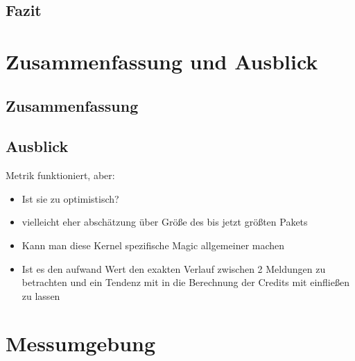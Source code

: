 \documentclass[a4paper, 12pt, BCOR10mm, DIV12, toc=bibliography, toc=listof, german]{scrbook}
\begin{document}

		\section{Fazit} %
		\label{sec:messungen-fazit}
		


	\chapter{Zusammenfassung und Ausblick} %
	\label{cha:zusammenfassung}

		\section{Zusammenfassung} %
		\label{sec:zusammenfassung}
			

		\section{Ausblick} %
		\label{sec:ausblick}

		Metrik funktioniert, aber:
		\begin{itemize}
			\item Ist sie zu optimistisch?
			\item vielleicht eher abschätzung über Größe des bis jetzt größten Pakets
			\item Kann man diese Kernel spezifische Magic allgemeiner machen
			\item Ist es den aufwand Wert den exakten Verlauf zwischen 2 Meldungen zu betrachten und ein
				Tendenz mit in die Berechnung der Credits mit einfließen zu lassen
		\end{itemize}
		
	


	\appendix

	\chapter{Messumgebung} %
	\label{cha:messumgebung}
	
	
	
\end{document}
